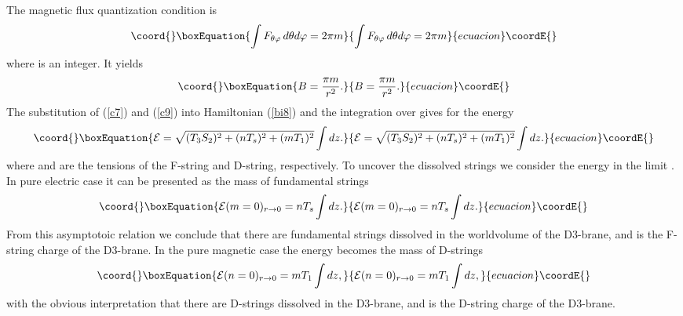 \documentclass[a4paper,12pt]{article}
\begin{document}
\noindent

The magnetic flux quantization condition is
\begin{equation}\coord{}\boxEquation{
\int F_{\theta \varphi}\,d\theta d\varphi =2\pi m
\label{c8}
}{
\int F_{\theta \varphi}\,d\theta d\varphi =2\pi m
}{ecuacion}\coordE{}\end{equation}
where \coordHE{} is an integer. It yields
\begin{equation}\coord{}\boxEquation{
B=\frac{\pi m}{r^2}.
\label{c9}
}{
B=\frac{\pi m}{r^2}.
}{ecuacion}\coordE{}\end{equation}
The substitution of (\ref{c7}) and (\ref{c9}) into Hamiltonian (\ref{bi8}) 
and the integration over \myHighlight{$\theta ,\varphi$}\coordHE{} gives for the energy \coordHE{} 
\begin{equation}\coord{}\boxEquation{
{\cal E}=\sqrt{(T_3S_2)^2+(nT_s)^2+(mT_1)^2}\int dz.
\label{c10}
}{
{\cal E}=\sqrt{(T_3S_2)^2+(nT_s)^2+(mT_1)^2}\int dz.
}{ecuacion}\coordE{}\end{equation}
where \coordHE{} and \coordHE{} are the tensions of the F-string 
and D-string, respectively.
To uncover the dissolved strings we consider the energy \coordHE{} in the 
limit \coordHE{}. In pure electric case it can be presented as the 
mass of \coordHE{} fundamental strings
\begin{equation}\coord{}\boxEquation{
{\cal E}(m=0)_{r\rightarrow 0}= nT_s\int dz.
\label{c11}
}{
{\cal E}(m=0)_{r\rightarrow 0}= nT_s\int dz.
}{ecuacion}\coordE{}\end{equation}
From this asymptotoic relation we conclude that there are \coordHE{} fundamental 
strings dissolved in the worldvolume of the D3-brane, and \coordHE{} is 
the F-string charge of the D3-brane. In the pure magnetic case the energy 
becomes the mass of \coordHE{} D-strings
\begin{equation}\coord{}\boxEquation{
{\cal E}(n=0)_{r\rightarrow 0}= mT_1\int dz,
\label{c12}
}{
{\cal E}(n=0)_{r\rightarrow 0}= mT_1\int dz,
}{ecuacion}\coordE{}\end{equation}
with the obvious interpretation that there are \coordHE{} D-strings dissolved in 
the D3-brane, and \coordHE{} is the D-string charge of the D3-brane. 

\noindent
\end{document}
